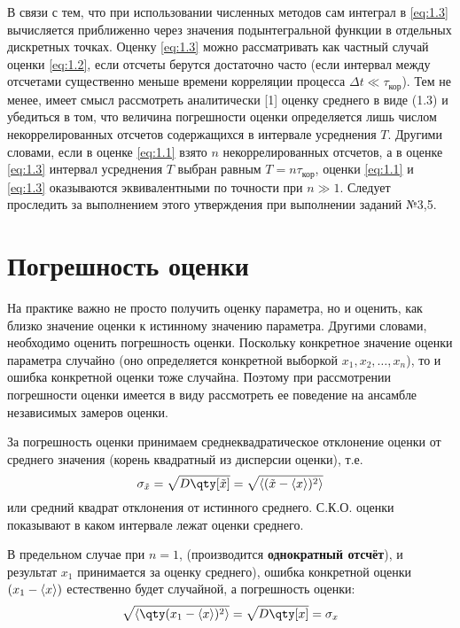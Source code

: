 В связи с тем, что при использовании численных методов сам интеграл в \eqref{eq:1.3}
вычисляется приближенно через значения подынтегральной функции в отдельных дискретных точках. Оценку 
\eqref{eq:1.3}  можно рассматривать как частный случай оценки \eqref{eq:1.2},
если отсчеты берутся достаточно часто (если интервал между отсчетами существенно меньше 
времени корреляции процесса $\Delta t \ll \tau_{\text{кор}}$). Тем не менее, имеет смысл
рассмотреть аналитически [1] оценку среднего в виде (1.3) и убедиться в том, что величина
погрешности оценки определяется лишь числом некоррелированных отсчетов содержащихся в 
интервале усреднения $T$.
Другими словами, если в оценке \eqref{eq:1.1}  взято $n$ некоррелированных отсчетов, а в
оценке \eqref{eq:1.3}  интервал усреднения $T$ выбран равным $T = n \tau_{\text{кор}}$,
оценки \eqref{eq:1.1}  и \eqref{eq:1.3}  оказываются эквивалентными по точности при $n\gg 1$. Следует проследить за выполнением этого утверждения при выполнении заданий №3,5.

\section{Погрешность оценки}%
\label{sec:pogreshnost_otsenki}
На практике важно не просто получить оценку параметра, но и оценить, как близко значение оценки к истинному значению параметра. Другими словами, необходимо оценить погрешность оценки. Поскольку конкретное значение оценки параметра случайно (оно определяется конкретной выборкой $x_{1},x_{2},\dots,x_n$), то и ошибка конкретной оценки тоже случайна. Поэтому при рассмотрении погрешности оценки имеется в виду рассмотреть ее поведение на ансамбле независимых замеров оценки.

За погрешность оценки принимаем среднеквадратическое отклонение оценки от среднего
значения (корень квадратный из дисперсии оценки), т.е.
\begin{equation}
    \label{eq:2.1}
    \sigma_{\tilde x} = \sqrt{ D\qty[\tilde x]} = \sqrt{ \mean{(\tilde x - \mean{x})^2} }
\end{equation}
или средний квадрат отклонения от истинного среднего. С.К.О. оценки показывают в каком интервале
лежат оценки среднего.

В предельном случае при $n=1$, (производится \textbf{однократный отсчёт}), и результат $x_{1}$ принимается за оценку среднего), ошибка конкретной оценки  $(x_{1}-\langle x\rangle)$ естественно будет случайной,
а погрешность оценки:
\begin{equation}
    \label{eq:2.2}
    \sqrt{ \mean{ \qty( x_{1} - \mean{x} )^2 } } = \sqrt{D\qty[x]} = \sigma_x
\end{equation}

